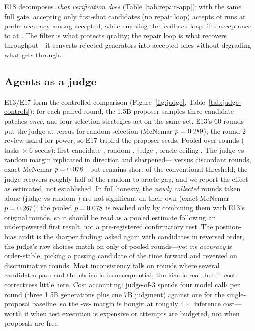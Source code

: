 \documentclass[11pt]{article}
\begin{document}
E18 decomposes \emph{what verification does}
(Table~\ref{tab:repair-app}): with the same full gate, accepting only
first-shot candidates (no repair loop) accepts \FilterAccept{} of runs at
probe accuracy \FilterProbeAccepted{} among accepted, while enabling the
feedback loop lifts acceptance to \LoopAccept{} at \LoopProbeAccepted.
The filter is what protects quality; the repair loop is what recovers
throughput---it converts rejected generators into accepted ones without
degrading what gets through.

\subsection{Agents-as-a-judge}\label{sec:judge-results}
E13/E17 form the controlled comparison (Figure~\ref{fig:judge},
Table~\ref{tab:judge-controls}): for each paired round, the 1.5B proposer
samples three candidate patches \emph{once}, and four selection strategies
act on the same set. E13's 60 rounds put the judge at \CtrlJudge{} versus
\CtrlRandom{} for random selection (McNemar $p=0.289$); the round-2
review asked for power, so E17 tripled the proposer seeds. Pooled over
\PooledRounds{} rounds (\NumTasks{} tasks $\times$ 6 seeds): first candidate
\PooledFirst, random \PooledRandom, judge \PooledJudge, oracle ceiling
\PooledOracle. The judge-vs-random margin replicated in direction and
sharpened---\PooledMcNemarB{} versus \PooledMcNemarC{} discordant rounds,
exact McNemar $p=0.078$---but remains short of the conventional
threshold; the judge recovers roughly half of the random-to-oracle gap, and
we report the effect as estimated, not established. In full honesty, the
\NewRounds{} \emph{newly collected} rounds taken alone (judge \NewJudge{} vs
random \NewRandom) are not significant on their own (exact McNemar
$p=0.267$); the pooled $p=0.078$ is reached only by combining
them with E13's original rounds, so it should be read as a pooled estimate
following an underpowered first result, not a pre-registered confirmatory test.
The position-bias audit
is the sharper finding: asked again with candidates in reversed order, the
judge's raw choices match on only \PooledConsistency{} of pooled rounds---yet
its \emph{accuracy} is order-stable, picking a passing candidate
\PooledFwdAcc{} of the time forward and \PooledRevAcc{} reversed on
discriminative rounds. Most inconsistency falls on rounds where several
candidates pass and the choice is inconsequential; the bias is real, but it
costs correctness little here. Cost accounting: judge-of-3 spends four model
calls per round (three 1.5B generations plus one 7B judgment) against one for
the single-proposal baseline, so the \PooledJudge-vs-\PooledFirst{} margin is
bought at roughly $4\times$ inference cost---worth it when test execution is
expensive or attempts are budgeted, not when proposals are free.
\end{document}
